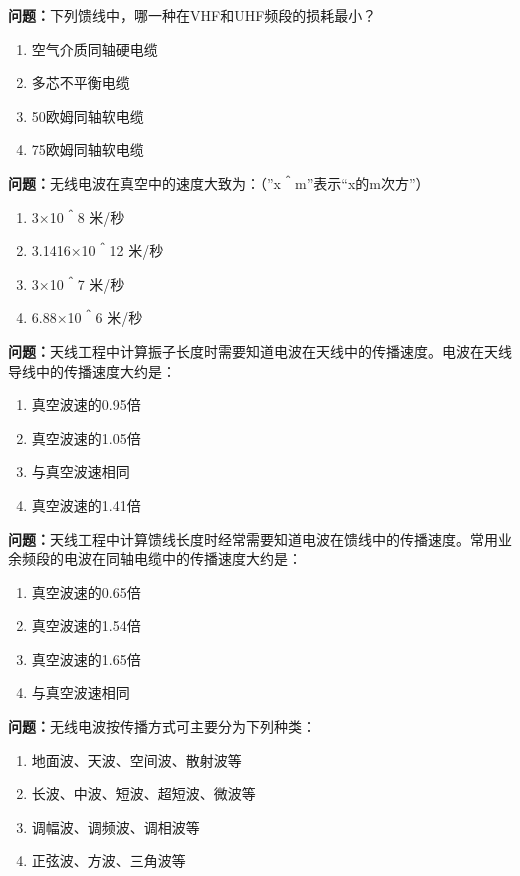 \documentclass{ctexbook}
\begin{document}
\textbf{问题：}下列馈线中，哪一种在VHF和UHF频段的损耗最小？
\begin{enumerate}[label=\Alph*), leftmargin=3em]
\item 空气介质同轴硬电缆
\item 多芯不平衡电缆
\item 50欧姆同轴软电缆
\item 75欧姆同轴软电缆
\end{enumerate}

\textbf{问题：}无线电波在真空中的速度大致为：（”x＾m”表示“x的m次方”）
\begin{enumerate}[label=\Alph*), leftmargin=3em]
\item 3×10＾8 米/秒
\item 3.1416×10＾12 米/秒
\item 3×10＾7 米/秒
\item 6.88×10＾6 米/秒
\end{enumerate}

\textbf{问题：}天线工程中计算振子长度时需要知道电波在天线中的传播速度。电波在天线导线中的传播速度大约是：
\begin{enumerate}[label=\Alph*), leftmargin=3em]
\item 真空波速的0.95倍
\item 真空波速的1.05倍
\item 与真空波速相同
\item 真空波速的1.41倍
\end{enumerate}

\textbf{问题：}天线工程中计算馈线长度时经常需要知道电波在馈线中的传播速度。常用业余频段的电波在同轴电缆中的传播速度大约是：
\begin{enumerate}[label=\Alph*), leftmargin=3em]
\item 真空波速的0.65倍
\item 真空波速的1.54倍
\item 真空波速的1.65倍
\item 与真空波速相同
\end{enumerate}

\textbf{问题：}无线电波按传播方式可主要分为下列种类：
\begin{enumerate}[label=\Alph*), leftmargin=3em]
\item 地面波、天波、空间波、散射波等
\item 长波、中波、短波、超短波、微波等
\item 调幅波、调频波、调相波等
\item 正弦波、方波、三角波等
\end{enumerate}
\end{document}
